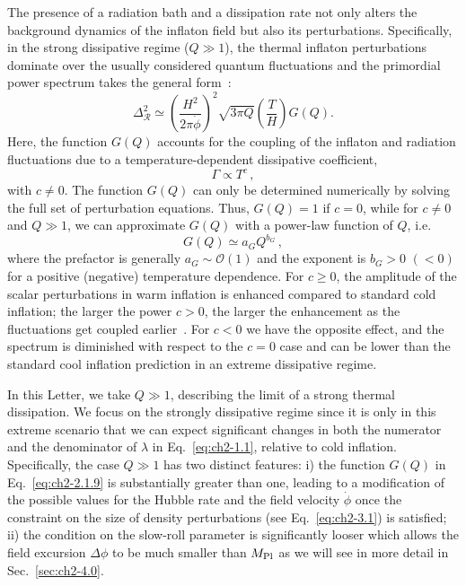 The presence of a radiation bath and a dissipation rate not only alters the background dynamics of the inflaton field but also its perturbations. Specifically, in the strong dissipative regime ($Q\gg1$), the thermal inflaton perturbations dominate over the usually considered quantum
fluctuations and the primordial power spectrum takes the general form~\citep{Hall:2003zp,Bastero-Gil:2011rva,Graham:2009bf,Ramos:2013nsa}:
\begin{equation}
    \Delta_{\mathcal{R}}^{2}\simeq\left(\frac{H^{2}}{2 \pi \dot{\phi}}\right)^{2}\sqrt{3\pi Q} \left(\frac{T}{H}\right) G(Q).
    \label{eq:ch2-2.1.9}
\end{equation}
Here, the function $G(Q)$ accounts for the coupling of the inflaton and radiation fluctuations due to a temperature-dependent dissipative coefficient,
\begin{equation}
    \Gamma\propto T^c\,,
\end{equation}
with $c\neq0$. The function $G(Q)$ can only be determined numerically by solving the full set of perturbation equations. Thus, $G(Q)=1$ if $c=0$, while for $c\neq0$ and $Q\gg1$, we can approximate $G(Q)$ with a power-law function of $Q$, i.e.
\begin{equation}
G(Q)\simeq a_G Q^{b_G} \, ,
\end{equation}
where the prefactor is generally $a_G\sim \mathcal{O}(1)$ and the exponent is $b_G>0$ $(<0)$ for a positive (negative) temperature dependence. For $c\geq 0$, the amplitude of the scalar perturbations in warm inflation is enhanced compared to standard cold inflation; the larger the power $c>0$, the larger the enhancement as the fluctuations get coupled earlier~\citep{Bastero-Gil:2011rva}. For $c<0$ we have the opposite effect, and
the spectrum is diminished with respect to the $c=0$ case and can be lower than the standard cool inflation prediction in an extreme dissipative regime.

In this Letter, we take $Q \gg 1$, describing the limit of a strong thermal dissipation. We focus on the strongly dissipative regime since it is only in this extreme scenario that we can expect significant changes in both the numerator and the denominator of $\lambda$ in Eq.~\ref{eq:ch2-1.1}, relative to cold inflation. Specifically, the case $Q\gg 1$ has two distinct features: i) the function $G(Q)$ in Eq.~\ref{eq:ch2-2.1.9} is substantially greater than one, leading to a modification of the possible values for the Hubble rate and the field velocity $\dot\phi$ once the constraint on the size of density perturbations (see Eq.~\ref{eq:ch2-3.1}) is satisfied; ii) the condition on the slow-roll parameter is significantly looser which allows the field excursion $\Delta \phi$ to be much smaller than $M_{\rm Pl}$ as we will see in more detail in Sec.~\ref{sec:ch2-4.0}.

